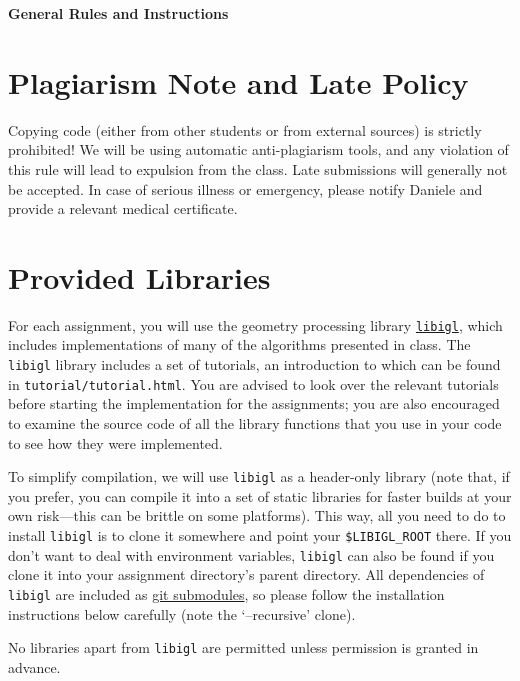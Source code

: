 \documentclass[11pt]{amsart}
\begin{document}
\hspace{50pt}

\begin{center}

{\Huge \textbf{General Rules and Instructions}}\\
\end{center}

\section*{Plagiarism Note and Late Policy}
Copying code (either from other students or from external sources) is strictly
prohibited! We will be using automatic anti-plagiarism tools, and any violation
of this rule will lead to expulsion from the class. Late submissions will
generally not be accepted. In case of serious illness or emergency, please notify
Daniele and provide a relevant medical certificate.

\section*{Provided Libraries}
For each assignment, you will use the geometry processing library
\href{https://github.com/libigl/libigl/}{\texttt{libigl}}, which
includes implementations of many of the algorithms presented in class.
The \texttt{libigl} library
includes a set of tutorials, an introduction to which can be found in
\texttt{tutorial/tutorial.html}. You are advised to look over the relevant
tutorials before starting the implementation for the
assignments; you are also encouraged to examine the source code of all
the library functions that you use in your code to see how they were
implemented.

To simplify compilation, we will use \texttt{libigl} as a header-only library
(note that, if you prefer, you can compile it into a set of static libraries for
faster builds at your own risk---this can be brittle on some platforms). This
way, all you need to do to install \texttt{libigl} is to clone it somewhere and
point your \texttt{\$LIBIGL\_ROOT} there. If you don't want to deal with
environment variables, \texttt{libigl} can also be found if you clone it into
your assignment directory's parent directory. All dependencies of
\texttt{libigl} are included as
\href{https://git-scm.com/book/en/v2/Git-Tools-Submodules}{git submodules}, so
please follow the installation instructions below carefully (note the
`--recursive' clone).

No libraries apart from \texttt{libigl} are permitted unless permission is
granted in advance.
\end{document}
